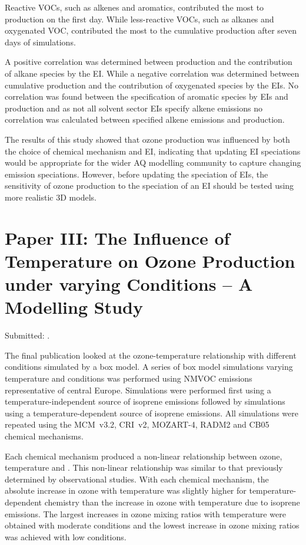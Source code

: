 Reactive VOCs, such as alkenes and aromatics, contributed the most to  production on the first day.
While less-reactive VOCs, such as alkanes and oxygenated VOC, contributed the most to the cumulative  production after seven days of simulations. 

A positive correlation was determined between  production and the contribution of alkane species by the EI.
While a negative correlation was determined between cumulative  production and the contribution of oxygenated species by the EIs.
No correlation was found between the specification of aromatic species by EIs and  production and as not all solvent sector EIs specify alkene emissions no correlation was calculated between specified alkene emissions and  production.

The results of this study showed that ozone production was influenced by both the choice of chemical mechanism and EI, indicating that updating EI speciations would be appropriate for the wider AQ modelling community to capture changing emission speciations.
However, before updating the speciation of EIs, the sensitivity of ozone production to the speciation of an EI should be tested using more realistic 3D models.

\vspace{-2mm}
\singlespacing
\section{Paper III: The Influence of Temperature on Ozone Production under varying  Conditions -- A Modelling Study} \label{s:T-O3_results}
\onehalfspacing

\vspace{-2mm}
\noindent
Submitted: .
\vspace{3mm}

The final publication looked at the ozone-temperature relationship with different  conditions simulated by a box model.
A series of box model simulations varying temperature and  conditions was performed using NMVOC emissions representative of central Europe. 
Simulations were performed first using a temperature-independent source of isoprene emissions followed by simulations using a temperature-dependent source of isoprene emissions.
All simulations were repeated using the MCM~v3.2, CRI~v2, MOZART-4, RADM2 and CB05 chemical mechanisms.

Each chemical mechanism produced a non-linear relationship between ozone, temperature and .
This non-linear relationship was similar to that previously determined by observational studies.  
With each chemical mechanism, the absolute increase in ozone with temperature was slightly higher for temperature-dependent chemistry than the increase in ozone with temperature due to isoprene emissions.
The largest increases in ozone mixing ratios with temperature were obtained with moderate  conditions and the lowest increase in ozone mixing ratios was achieved with low  conditions.

